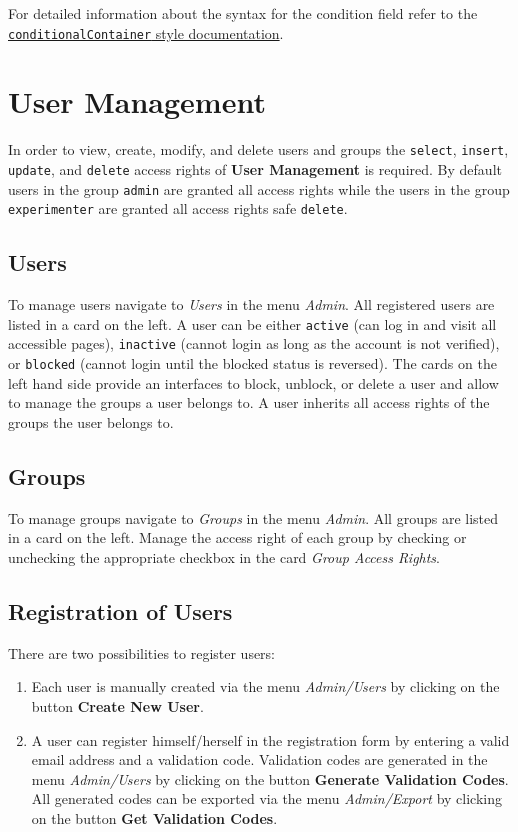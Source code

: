 \documentclass[a4paper,oneside]{book}
\begin{document}
For detailed information about the syntax for the condition field refer to the \href{https://selfhelp.psy.unibe.ch/demo/style/446}{\texttt{conditionalContainer} style documentation}.

\chapter{User Management}\label{sec.user}
In order to view, create, modify, and delete users and groups the \texttt{select}, \texttt{insert}, \texttt{update}, and \texttt{delete} access rights of \textbf{User Management} is required.
By default users in the group \texttt{admin} are granted all access rights while the users in the group \texttt{experimenter} are granted all access rights safe \texttt{delete}.

\section{Users}
To manage users navigate to \emph{Users} in the menu \emph{Admin}.
All registered users are listed in a card on the left.
A user can be either \texttt{active} (can log in and visit all accessible pages), \texttt{inactive} (cannot login as long as the account is not verified), or \texttt{blocked} (cannot login until the blocked status is reversed).
The cards on the left hand side provide an interfaces to block, unblock, or delete a user and allow to manage the groups a user belongs to.
A user inherits all access rights of the groups the user belongs to.

\section{Groups}
To manage groups navigate to \emph{Groups} in the menu \emph{Admin}.
All groups are listed in a card on the left.
Manage the access right of each group by checking or unchecking the appropriate checkbox in the card \emph{Group Access Rights}.

\section{Registration of Users}
There are two possibilities to register users:

\begin{enumerate}
    \item Each user is manually created via the menu \emph{Admin/Users} by clicking on the button \textbf{Create New User}.
    \item A user can register himself/herself in the registration form by entering a valid email address and a validation code.
        Validation codes are generated in the menu \emph{Admin/Users} by clicking on the button \textbf{Generate Validation Codes}.
        All generated codes can be exported via the menu \emph{Admin/Export} by clicking on the button \textbf{Get Validation Codes}.
\end{enumerate}
\end{document}
